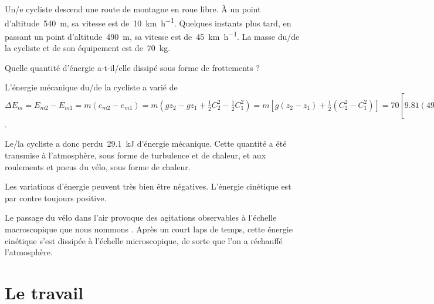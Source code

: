 		\begin{anexample}
			Un/e cycliste descend une route de montagne en roue libre. À un point d’altitude~\SI{540}{\metre}, sa vitesse est de~\SI[per-mode = symbol]{10}{\kilo\metre\per\hour}. Quelques instants plus tard, en passant un point d’altitude~\SI{490}{\metre}, sa vitesse est de~\SI[per-mode = symbol]{45}{\kilo\metre\per\hour}. La masse du/de la cycliste et de son équipement est de~\SI{70}{\kilogram}.
			
			Quelle quantité d’énergie a-t-il/elle dissipé sous forme de frottements ?
			
				\begin{answer}
					L’énergie mécanique du/de la cycliste a varié de $\Delta E_m = E_{m 2} - E_{m 1} = m (e_{m 2} - e_{m 1}) = m (g z_2 - g z_1 + \frac{1}{2} C_2^2 - \frac{1}{2} C_1^2) =  m \left[ g (z_2 - z_1) + \frac{1}{2} (C_2^2 - C_1^2)\right] = 70 \left[ \num{9,81} (490 - 540) + \frac{1}{2} \left( \left(\frac{\num{45e3}}{\num{3600}}\right)^2 - \left(\frac{\num{10e3}}{\num{3600}}\right)^2\right) \right] = 70 \left[ \num{-490,5} + \num{74,3} \right] = \SI{-2,91e4}{\joule} = \SI{-29,1}{\kilo\joule}$.
					
					Le/la cycliste a donc perdu~\SI{29,1}{\kilo\joule} d’énergie mécanique. Cette quantité a été transmise à l’atmosphère, sous forme de turbulence et de chaleur, et aux roulements et pneus du vélo, sous forme de chaleur.
						\begin{remark}Les variations d’énergie peuvent très bien être négatives. L’énergie cinétique est par contre toujours positive. \end{remark}
						\begin{remark}Le passage du vélo dans l’air provoque des agitations observables à l’échelle macroscopique que nous nommons . Après un court laps de temps, cette énergie cinétique s’est dissipée à l’échelle microscopique, de sorte que l’on a réchauffé l’atmosphère. \end{remark}
				\end{answer}
		\end{anexample}



\section{Le travail}
\label{ch_travail_fdl}

